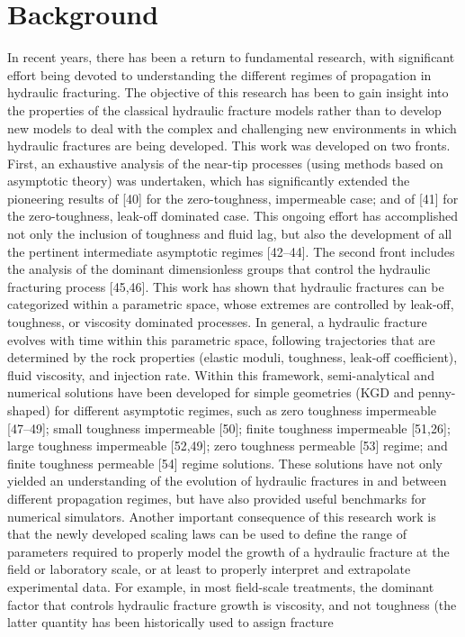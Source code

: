 \section{Background}







    In recent years, there has been a return to fundamental research, with significant effort being devoted to understanding the different regimes of propagation in hydraulic fracturing. The objective of this research has been to gain insight into the properties of the classical hydraulic fracture models rather than to develop new models to deal with the complex and challenging new environments in which hydraulic fractures are being developed. This work was developed on two fronts. First, an exhaustive analysis of the near-tip processes (using methods based on asymptotic theory) was undertaken, which has significantly extended the pioneering results of [40] for the zero-toughness, impermeable case; and of [41] for the zero-toughness, leak-off dominated case. This ongoing effort has accomplished not only the inclusion of toughness and fluid lag, but also the development of all the pertinent intermediate asymptotic regimes [42–44]. The second front includes the analysis of the dominant dimensionless groups that control the hydraulic fracturing process [45,46]. This work has shown that hydraulic fractures can be categorized within a parametric space, whose extremes are controlled by leak-off, toughness, or viscosity dominated processes. In general, a hydraulic fracture evolves with time within this parametric space, following trajectories that are determined by the rock properties (elastic moduli, toughness, leak-off coefficient), fluid viscosity, and injection rate. Within this framework, semi-analytical and numerical solutions have been developed for simple geometries (KGD and penny-shaped) for different asymptotic regimes, such as zero toughness impermeable [47–49]; small toughness impermeable [50]; finite toughness impermeable [51,26]; large toughness impermeable [52,49]; zero toughness permeable [53] regime; and finite toughness permeable [54] regime solutions. These solutions have not only yielded an understanding of the evolution of hydraulic fractures in and between different propagation regimes, but have also provided useful benchmarks for numerical simulators. Another important consequence of this research work is that the newly developed scaling laws can be used to define the range of parameters required to properly model the growth of a hydraulic fracture at the field or laboratory scale, or at least to properly interpret and extrapolate experimental data. For example, in most field-scale treatments, the dominant factor that controls hydraulic fracture growth is viscosity, and not toughness (the latter quantity has been historically used to assign fracture 